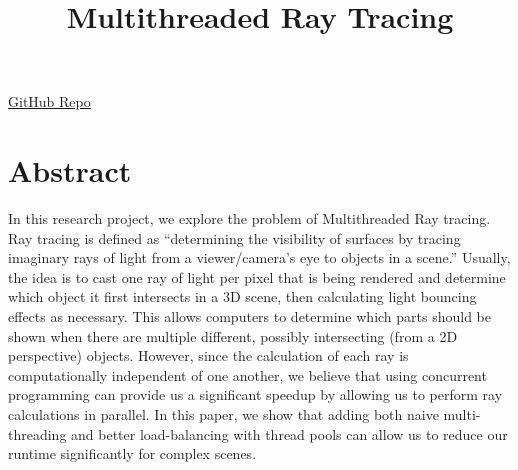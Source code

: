 \documentclass[conference]{IEEEtran}
\begin{document}
\title{Multithreaded Ray Tracing}

\author{
\and
{}
\and
{}
\and
{}
\and
{}

}

\maketitle



\begin{center}
\href{https://github.com/PedroContipelli/Parallel-Raycasting}{GitHub Repo}
\end{center}

\section{Abstract}
In this research project, we explore the problem of Multithreaded Ray tracing. Ray tracing is defined as “determining the visibility of surfaces by tracing imaginary rays of light from a viewer/camera’s eye to objects in a scene.” Usually, the idea is to cast one ray of light per pixel that is being rendered and determine which object it first intersects in a 3D scene, then calculating light bouncing effects as necessary. This allows computers to determine which parts should be shown when there are multiple different, possibly intersecting (from a 2D perspective) objects. However, since the calculation of each ray is computationally independent of one another, we believe that using concurrent programming can provide us a significant speedup by allowing us to perform ray calculations in parallel. In this paper, we show that adding both naive multi-threading and better load-balancing with thread pools can allow us to reduce our runtime significantly for complex scenes.
\end{document}
